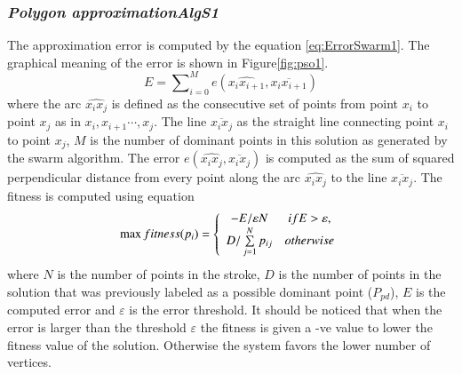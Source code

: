 \documentclass[preprint,1p,times,review]{elsarticle}
\begin{document}
\subsubsection{\textit{Polygon approximation\textsl{AlgS1}}}
The approximation error is computed by the equation \ref{eq:ErrorSwarm1}. The
graphical meaning of the error is shown in Figure\ref{fig:pso1}.%
\begin{equation}
E=\sum\nolimits_{i = 0}^M e ( \widehat{x_ix_{i+1}},\overline{x_i x_{i+1}})
\label{eq:ErrorSwarm1}
\end{equation} where the arc $\widehat{x_ix_j}$ is defined as the consecutive
set of points from point $x_i$ to point $x_{j}$ as in $x_i,x_{i+1} \cdots,x_j$.
The line $\overline{x_i x_j} $ as the straight line connecting point $x_i$ to
point $x_j$, $M$ is the number of dominant points in this solution as generated
by the swarm algorithm. The error $e ( \widehat{x_ix_j},\overline{x_i x_j})$ is
computed as the sum of squared perpendicular distance from every point along the
arc $\widehat{x_ix_j}$ to the line $\overline{x_i x_j}$. The fitness is computed
using equation %
\begin{equation}
\max fitness(p_i ) = \left\{ {\begin{array}{*{20}c}
   { - E/\varepsilon N} & {ifE > \varepsilon ,}  \\
   {D/\sum\limits_{j = 1}^N {p_{ij} } } & {otherwise}  \\
\end{array}} \right.
\label{eq:fitnessSwarm1}
\end{equation} where $N$ is the number of points in the stroke, $D$ is the
number of points in the solution that was previously labeled as a possible
dominant point ($P_{pd}$), $E$ is the computed error and $\varepsilon$ is the
error threshold. It should be noticed that when the error is larger than the
threshold $\varepsilon$ the fitness is given a -ve value to lower the fitness
value of the solution. Otherwise the system favors the lower number of vertices.
\end{document}
